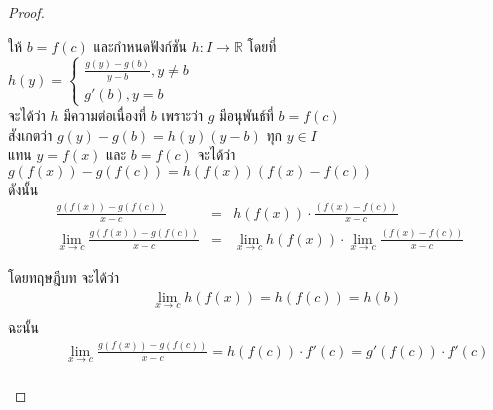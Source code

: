 \documentclass[12pt, a4paper]{article}
\begin{document}
\begin{enumerate}
    \begin{proof}
        \begin{enumerate} ให้ $b=f\left ( c \right )$ และกำหนดฟังก์ชัน $h: I\rightarrow \mathbb{R}$ โดยที่ \\
        \hspace{4cm} $ h(y)=\left\{\begin{matrix}
            \frac{g(y)-g(b)}{y-b} ,y\neq b\\ 
            g'\left ( b \right ) ,y=b
            \end{matrix}\right.$\\
        \hspace{1cm}จะได้ว่า  $h$ มีความต่อเนื่องที่ $b$ เพราะว่า $g$ มีอนุพันธ์ที่ $b=f\left ( c \right )$ \\
        สังเกตว่า $g(y)-g(b)=h(y)(y-b)$ ทุก $y\in I$\\
        แทน $y=f\left ( x \right )$ และ $b=f\left ( c \right )$ จะได้ว่า $g\left ( f\left ( x \right ) \right )-g\left ( f\left ( c \right ) \right )=h\left ( f(x) \right ) \left ( f\left ( x \right ) -f\left ( c \right )\right )$\\
        ดังนั้น    \begin{eqnarray*}
            \frac{g\left ( f\left ( x \right ) \right )-g\left ( f\left ( c \right ) \right )}{x-c}    &=&   h\left ( f(x) \right ) \cdot   \frac{ \left ( f\left ( x \right ) -f\left ( c \right )\right )}{x-c}\\
            \lim_{x\rightarrow c}\frac{g\left ( f\left ( x \right ) \right )-g\left ( f\left ( c \right ) \right )}{x-c}  &=&\lim_{x\rightarrow c}   h\left ( f(x) \right ) \cdot \lim_{x\rightarrow c}  \frac{ \left ( f\left ( x \right ) -f\left ( c \right )\right )}{x-c}
                \end{eqnarray*}

        โดยทฤษฎีบท จะได้ว่า
        \begin{eqnarray*}\hspace{1cm}
         \lim_{x\rightarrow c}h\left ( f\left ( x \right ) \right )=h\left ( f\left ( c \right ) \right )=h\left ( b \right )\\
        \end{eqnarray*}
         ฉะนั้น \begin{eqnarray*}\hspace{1cm}   \lim_{x\rightarrow c}\frac{g\left ( f\left ( x \right ) \right )-g\left ( f\left ( c \right ) \right )}{x-c}  =h\left ( f\left ( c \right ) \right )\cdot{ f}'\left ( c \right )={g}'\left ( f\left ( c \right ) \right )\cdot {f}'\left ( c \right )\\
        \end{eqnarray*}


\end{enumerate}
\end{proof}
\end{enumerate}
\end{document}
